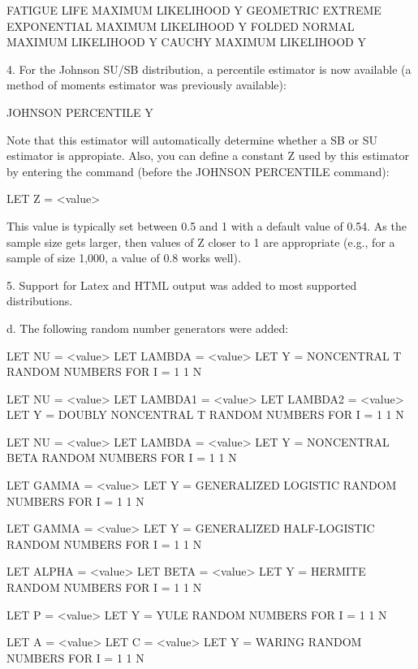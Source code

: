 {            FATIGUE LIFE MAXIMUM LIKELIHOOD Y
            GEOMETRIC EXTREME EXPONENTIAL MAXIMUM LIKELIHOOD Y
            FOLDED NORMAL MAXIMUM LIKELIHOOD Y
            CAUCHY MAXIMUM LIKELIHOOD Y

       4. For the Johnson SU/SB distribution, a percentile
          estimator is now available (a method of moments
          estimator was previously available):

             JOHNSON PERCENTILE Y

          Note that this estimator will automatically determine
          whether a SB or SU estimator is appropiate.  Also, you
          can define a constant Z used by this estimator by
          entering the command (before the JOHNSON PERCENTILE
          command):

             LET Z = <value>

          This value is typically set between 0.5 and 1 with a
          default value of 0.54.  As the sample size gets larger,
          then values of Z closer to 1 are appropriate (e.g.,
          for a sample of size 1,000, a value of 0.8 works well).

       5. Support for Latex and HTML output was added to most
          supported distributions.

    d. The following random number generators were added:

         LET NU = <value>
         LET LAMBDA = <value>
         LET Y = NONCENTRAL T RANDOM NUMBERS FOR I = 1 1 N

         LET NU = <value>
         LET LAMBDA1 = <value>
         LET LAMBDA2 = <value>
         LET Y = DOUBLY NONCENTRAL T RANDOM NUMBERS FOR I = 1 1 N

         LET NU = <value>
         LET LAMBDA = <value>
         LET Y = NONCENTRAL BETA RANDOM NUMBERS FOR I = 1 1 N

         LET GAMMA = <value>
         LET Y = GENERALIZED LOGISTIC RANDOM NUMBERS FOR I = 1 1 N

         LET GAMMA = <value>
         LET Y = GENERALIZED HALF-LOGISTIC RANDOM NUMBERS FOR I = 1 1 N

         LET ALPHA = <value>
         LET BETA = <value>
         LET Y = HERMITE RANDOM NUMBERS FOR I = 1 1 N

         LET P = <value>
         LET Y = YULE RANDOM NUMBERS FOR I = 1 1 N

         LET A = <value>
         LET C = <value>
         LET Y = WARING RANDOM NUMBERS FOR I = 1 1 N

}
